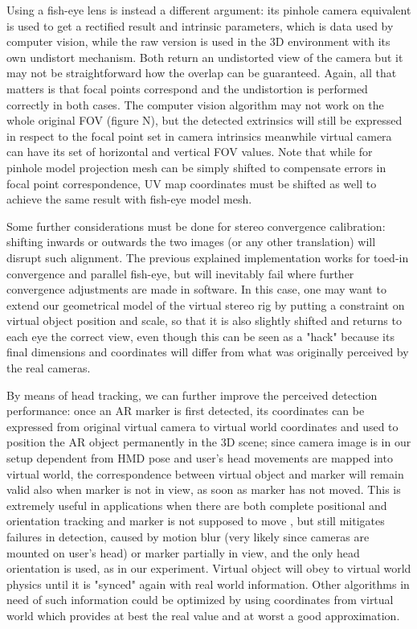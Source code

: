 Using a fish-eye lens is instead a different argument: its pinhole camera equivalent is used to get a rectified result and intrinsic parameters, which is data used by computer vision, while the raw version is used in the 3D environment with its own undistort mechanism. Both return an undistorted view of the camera but it may not be straightforward how the overlap can be guaranteed. Again, all that matters is that focal points correspond and the undistortion is performed correctly in both cases. The computer vision algorithm may not work on the whole original FOV (figure N), but the detected extrinsics will still be expressed in respect to the focal point set in camera intrinsics meanwhile virtual camera can have its set of horizontal and vertical FOV values. Note that while for pinhole model projection mesh can be simply shifted to compensate errors in focal point correspondence, UV map coordinates must be shifted as well to achieve the same result with fish-eye model mesh.

Some further considerations must be done for stereo convergence calibration: shifting inwards or outwards the two images (or any other translation) will disrupt such alignment. The previous explained implementation works for toed-in convergence and parallel fish-eye, but will inevitably fail where further convergence adjustments are made in software. In this case, one may want to extend our geometrical model of the virtual stereo rig by putting a constraint on virtual object position and scale, so that it is also slightly shifted and returns to each eye the correct view, even though this can be seen as a "hack" because its final dimensions and coordinates will differ from what was originally perceived by the real cameras.

By means of head tracking, we can further improve the perceived detection performance: once an AR marker is first detected, its coordinates can be expressed from original virtual camera to virtual world coordinates and used to position the AR object permanently in the 3D scene; since camera image is in our setup dependent from HMD pose and user's head movements are mapped into virtual world, the correspondence between virtual object and marker will remain valid also when marker is not in view, as soon as marker has not moved. This is extremely useful in applications when there are both complete positional and orientation tracking and marker is not supposed to move \cite{link_aruco_ogre}, but still mitigates failures in detection, caused by motion blur (very likely since cameras are mounted on user's head)  or marker partially in view, and the only head orientation is used, as in our experiment. Virtual object will obey to virtual world physics until it is "synced" again with real world information. Other algorithms in need of such information could be optimized by using coordinates from virtual world which provides at best the real value and at worst a good approximation.

